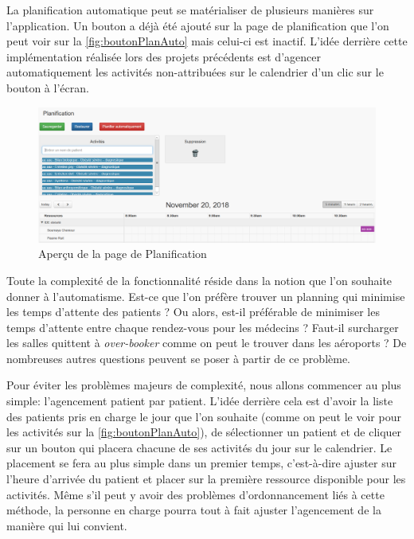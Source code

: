 \documentclass{polytech/polytech}
\begin{document}
La planification automatique peut se matérialiser de plusieurs manières sur l'application. Un bouton a déjà été ajouté sur la page de planification que l'on peut voir sur la \autoref{fig:boutonPlanAuto} mais celui-ci est inactif. L'idée derrière cette implémentation réalisée lors des projets précédents est d'agencer automatiquement les activités non-attribuées sur le calendrier d'un clic sur le bouton à l'écran. 

\begin{figure}
	\includegraphics[scale=0.4]{images/bouton_plan_auto}
	\caption{Aperçu de la page de Planification}
	\label{fig:boutonPlanAuto}
\end{figure}

Toute la complexité de la fonctionnalité réside dans la notion que l'on souhaite donner à l'automatisme. Est-ce que l'on préfère trouver un planning qui minimise les temps d'attente des patients ? Ou alors, est-il préférable de minimiser les temps d'attente entre chaque rendez-vous pour les médecins ? Faut-il surcharger les salles quittent à \textit{over-booker} comme on peut le trouver dans les aéroports ? De nombreuses autres questions peuvent se poser à partir de ce problème.

Pour éviter les problèmes majeurs de complexité, nous allons commencer au plus simple: l'agencement patient par patient. L'idée derrière cela est d'avoir la liste des patients pris en charge le jour que l'on souhaite (comme on peut le voir pour les activités sur la \autoref{fig:boutonPlanAuto}), de sélectionner un patient et de cliquer sur un bouton qui placera chacune de ses activités du jour sur le calendrier. Le placement se fera au plus simple dans un premier temps, c'est-à-dire ajuster sur l'heure d'arrivée du patient et placer sur la première ressource disponible pour les activités. Même s'il peut y avoir des problèmes d'ordonnancement liés à cette méthode, la personne en charge pourra tout à fait ajuster l'agencement de la manière qui lui convient.
\end{document}
